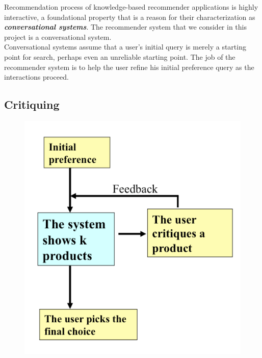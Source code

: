Recommendation process of knowledge-based recommender applications is highly interactive, a foundational property that is a reason for their characterization as \textit{\textbf{conversational systems}}. The recommender system that we consider in this project is a conversational system.\\
Conversational systems assume that a user's initial query is merely a starting point for search, perhaps even an unreliable starting point. The job of the recommender system is to help the user refine his initial preference query as the interactions proceed.

\subsection{Critiquing}

\begin{figure}
\centering
\begin{minipage}{.5\textwidth}
  \centering
  \includegraphics[width=1\linewidth]{figures-bharath/critiquing.png}
  \label{fig:critiquing}
\end{minipage}%
\begin{minipage}{.5\textwidth}
  \centering

\end{minipage}
\end{figure}
